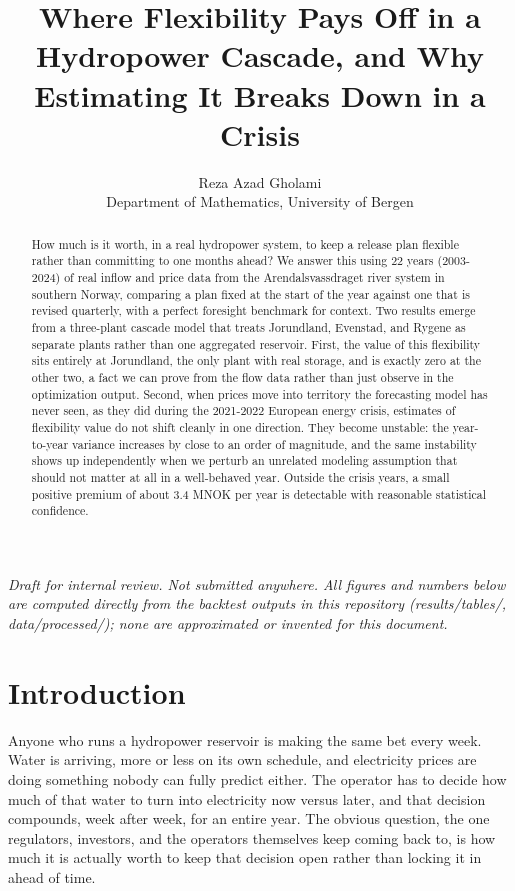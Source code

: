 \documentclass[11pt]{article}
\title{Where Flexibility Pays Off in a Hydropower Cascade, and Why Estimating It Breaks Down in a Crisis}
\author{Reza Azad Gholami \\ \normalsize Department of Mathematics, University of Bergen}
\date{}
\begin{document}
\maketitle

\begin{center}
\emph{Draft for internal review. Not submitted anywhere. All figures and numbers below are computed directly from the backtest outputs in this repository (results/tables/, data/processed/); none are approximated or invented for this document.}
\end{center}

\begin{abstract}
How much is it worth, in a real hydropower system, to keep a release plan flexible rather than committing to one months ahead? We answer this using 22 years (2003-2024) of real inflow and price data from the Arendalsvassdraget river system in southern Norway, comparing a plan fixed at the start of the year against one that is revised quarterly, with a perfect foresight benchmark for context. Two results emerge from a three-plant cascade model that treats Jorundland, Evenstad, and Rygene as separate plants rather than one aggregated reservoir. First, the value of this flexibility sits entirely at Jorundland, the only plant with real storage, and is exactly zero at the other two, a fact we can prove from the flow data rather than just observe in the optimization output. Second, when prices move into territory the forecasting model has never seen, as they did during the 2021-2022 European energy crisis, estimates of flexibility value do not shift cleanly in one direction. They become unstable: the year-to-year variance increases by close to an order of magnitude, and the same instability shows up independently when we perturb an unrelated modeling assumption that should not matter at all in a well-behaved year. Outside the crisis years, a small positive premium of about 3.4 MNOK per year is detectable with reasonable statistical confidence.
\end{abstract}

\section{Introduction}

Anyone who runs a hydropower reservoir is making the same bet every week. Water is arriving, more or less on its own schedule, and electricity prices are doing something nobody can fully predict either. The operator has to decide how much of that water to turn into electricity now versus later, and that decision compounds, week after week, for an entire year. The obvious question, the one regulators, investors, and the operators themselves keep coming back to, is how much it is actually worth to keep that decision open rather than locking it in ahead of time.
\end{document}
